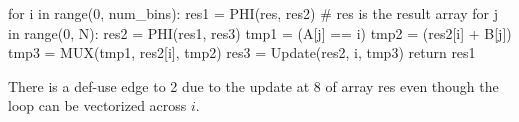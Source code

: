 {\small
\begin{pythonn}
for i in range(0, num_bins):
  res1 = PHI(res, res2) # res is the result array
  for j in range(0, N):
    res2 = PHI(res1, res3)
    tmp1 = (A[j] == i)
    tmp2 = (res2[i] + B[j])
    tmp3 = MUX(tmp1, res2[i], tmp2)
    res3 = Update(res2, i, tmp3)
return res1
\end{pythonn}
}

There is a def-use edge to 2 due to the update at 8 of array {\sf res} even though the loop can be vectorized across $i$.

\begin{comment}
Consider the classical example from~\cite{Aiken:1988}: 


{\small
\begin{pythonn}
for i in range(N):
  A[i] = B[i] + 10;
  B[i] = A[i] * D[i-1];
  C[i] = A[i] * D[i-1];
  D[i] = B[i] * C[i];
\end{pythonn}
}

In Cytron's SSA this code (roughly) translates into

{\small
\begin{pythonn}
for i in range(N):
  A_1 = PHI(A_0,A_2)
  B_1 = PHI(B_0,B_2)
  C_1 = PHI(C_0,C_2)
  D_1 = PHI(D_0,D_2)
  A_2 = update(A_1, i, B_1[i] + 10);
  B_2 = update(B_1, i, A_2[i] * D_1[i-1]);
  C_2 = update(C_1, i, A_2[i] * D_1[i-1]);
  D_2 = update(D_1, i, B_2[i] * C_2[i]);
\end{pythonn}
}

There is a cycle around {\sf B\_1 = PHI(B\_0,B\_2)} that includes statement
{\sf A\_1 = update(A\_0, i, B\_1[i] + 10)} and that statement won't be vectorized even
though in fact there is no loop-carried dependency from the write of {\sf B\_1[i]} at 7 to the
read of {\sf ... = B\_1[i]} at 6.
\end{comment}

